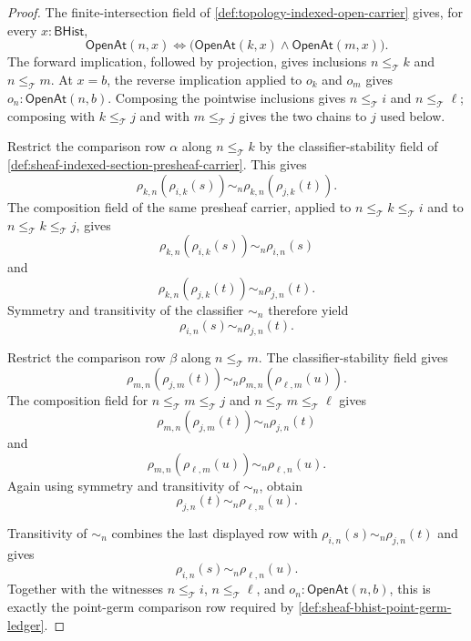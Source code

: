 \begin{proof}
The finite-intersection field of \autoref{def:topology-indexed-open-carrier} gives, for every $x:\mathsf{BHist}$,
$$
\mathsf{OpenAt}(n,x)
\Longleftrightarrow
\bigl(\mathsf{OpenAt}(k,x)\wedge\mathsf{OpenAt}(m,x)\bigr).
$$
The forward implication, followed by projection, gives inclusions $n\le_{\mathcal{T}}k$ and $n\le_{\mathcal{T}}m$. At $x=b$, the reverse implication applied to $o_k$ and $o_m$ gives $o_n:\mathsf{OpenAt}(n,b)$. Composing the pointwise inclusions gives $n\le_{\mathcal{T}}i$ and $n\le_{\mathcal{T}}\ell$; composing with $k\le_{\mathcal{T}}j$ and with $m\le_{\mathcal{T}}j$ gives the two chains to $j$ used below.

Restrict the comparison row $\alpha$ along $n\le_{\mathcal{T}}k$ by the classifier-stability field of \autoref{def:sheaf-indexed-section-presheaf-carrier}. This gives
$$
\rho_{k,n}(\rho_{i,k}(s))
\sim_n
\rho_{k,n}(\rho_{j,k}(t)).
$$
The composition field of the same presheaf carrier, applied to $n\le_{\mathcal{T}}k\le_{\mathcal{T}}i$ and to $n\le_{\mathcal{T}}k\le_{\mathcal{T}}j$, gives
$$
\rho_{k,n}(\rho_{i,k}(s))\sim_n\rho_{i,n}(s)
$$
and
$$
\rho_{k,n}(\rho_{j,k}(t))\sim_n\rho_{j,n}(t).
$$
Symmetry and transitivity of the classifier $\sim_n$ therefore yield
$$
\rho_{i,n}(s)\sim_n\rho_{j,n}(t).
$$

Restrict the comparison row $\beta$ along $n\le_{\mathcal{T}}m$. The classifier-stability field gives
$$
\rho_{m,n}(\rho_{j,m}(t))
\sim_n
\rho_{m,n}(\rho_{\ell,m}(u)).
$$
The composition field for $n\le_{\mathcal{T}}m\le_{\mathcal{T}}j$ and $n\le_{\mathcal{T}}m\le_{\mathcal{T}}\ell$ gives
$$
\rho_{m,n}(\rho_{j,m}(t))\sim_n\rho_{j,n}(t)
$$
and
$$
\rho_{m,n}(\rho_{\ell,m}(u))\sim_n\rho_{\ell,n}(u).
$$
Again using symmetry and transitivity of $\sim_n$, obtain
$$
\rho_{j,n}(t)\sim_n\rho_{\ell,n}(u).
$$

Transitivity of $\sim_n$ combines the last displayed row with $\rho_{i,n}(s)\sim_n\rho_{j,n}(t)$ and gives
$$
\rho_{i,n}(s)\sim_n\rho_{\ell,n}(u).
$$
Together with the witnesses $n\le_{\mathcal{T}}i$, $n\le_{\mathcal{T}}\ell$, and $o_n:\mathsf{OpenAt}(n,b)$, this is exactly the point-germ comparison row required by \autoref{def:sheaf-bhist-point-germ-ledger}.
\end{proof}
